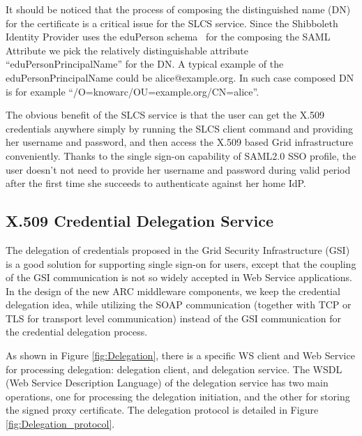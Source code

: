 \documentclass[twocolumn]{svjour3}         %
\begin{document}
It should be noticed that the process of composing the distinguished name (DN) for the certificate is a critical issue for the SLCS service. Since the Shibboleth Identity Provider uses the eduPerson schema~\cite{eduSchemalink} for the composing the SAML Attribute we pick the relatively distinguishable attribute “eduPersonPrincipalName” for the DN. A typical example of the eduPersonPrincipalName  could be alice@example.org. In such case composed DN is for example “/O=knowarc/OU=example.org/CN=alice”.

The obvious benefit of the SLCS service is that the user can get the X.509 credentials anywhere simply by running the SLCS client command and providing her username and password, and then access the X.509 based Grid infrastructure conveniently. Thanks to the single sign-on capability of SAML2.0 SSO profile, the user doesn’t not need to provide her username and password during valid period after the first time she succeeds to authenticate against her home IdP.


\subsection{X.509 Credential Delegation Service}
\label{sec:creddeleg}
The delegation of credentials proposed in the Grid Security Infrastructure (GSI) is a good solution for supporting single sign-on for users, except that the coupling of the GSI communication is not so widely accepted in Web Service applications. In the design of the new ARC middleware components, we keep the credential delegation idea, while utilizing the SOAP communication (together with TCP or TLS for transport level communication) instead of the GSI communication for the credential delegation process.

As shown in Figure \ref{fig:Delegation}, there is a specific WS client and Web Service for processing delegation: delegation client, and delegation service. The WSDL (Web Service Description Language) of the delegation service has two main operations, one for processing the delegation initiation, and the other for storing the signed proxy certificate. The delegation protocol is detailed in Figure \ref{fig:Delegation_protocol}.
\end{document}
